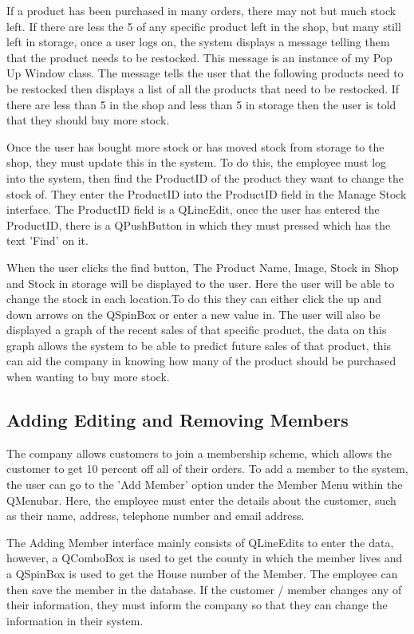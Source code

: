 If a product has been purchased in many orders, there may not but much stock left. If there are less the 5 of any specific product left in the shop, but many still left in storage, once a user logs on, the system displays a message telling them that the product needs to be restocked. This message is an instance of my Pop Up Window class. The message tells the user that the following products need to be restocked then displays a list of all the products that need to be restocked. If there are less than 5 in the shop and less than 5 in storage then the user is told that they should buy more stock. 

Once the user has bought more stock or has moved stock from storage to the shop, they must update this in the system. To do this, the employee must log into the system, then find the ProductID of the product they want to change the stock of. They enter the ProductID into the ProductID field in the Manage Stock interface. The ProductID field is a QLineEdit, once the user has entered the ProductID, there is a QPushButton in which they must pressed which has the text 'Find' on it. 

When the user clicks the find button, The Product Name, Image, Stock in Shop and Stock in storage will be displayed to the user. Here the user will be able to change the stock in each location.To do this they can either click the up and down arrows on the QSpinBox or enter a new value in. The user will also be displayed a graph of the recent sales of that specific product, the data on this graph allows the system to be able to predict future sales of that product, this can aid the company in knowing how many of the product should be purchased when wanting to buy more stock.

\subsection{Adding Editing and Removing Members}

The company allows customers to join a membership scheme, which allows the customer to get 10 percent off all of their orders. To add a member to the system, the user can go to the 'Add Member' option under the Member Menu within the QMenubar. Here, the employee must enter the details about the customer, such as their name, address, telephone number and email address. 

The Adding Member interface mainly consists of QLineEdits to enter the data, however, a QComboBox is used to get the county in which the member lives and a QSpinBox is used to get the House number of the Member. The employee can then save the member in the database. If the customer / member changes any of their information, they must inform the company so that they can change the information in their system. 

